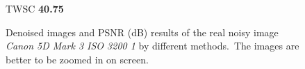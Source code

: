 \begin{figure}[t!]
{\begin{minipage}[t]{0.19\textwidth}
{\footnotesize TWSC \textbf{40.75}}
\end{minipage}
}\vspace{-3mm}
    \caption{Denoised images and PSNR (dB) results of the real noisy image \textsl{Canon 5D Mark 3 ISO 3200 1} \cite{crosschannel2016} by different methods.\ The images are better to be zoomed in on screen.}
    \label{fig5-11}
\end{figure}


\begin{figure}[t!]
    \centering
{}
\end{figure}
